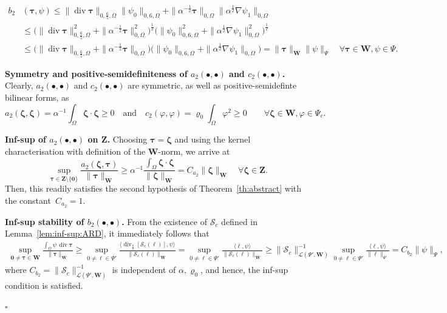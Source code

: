 \documentclass[11pt, reqno, a4paper, twoside]{article}
\newcommand\bzeta{\boldsymbol{\zeta}}
\newcommand\bzero{\boldsymbol{0}}
\newcommand\btau{\boldsymbol{\tau}}
\newcommand{\bW}{\mathbf{W}}
\newcommand{\bZ}{\mathbf{Z}}
\newcommand{\cL}{\mathcal{L}}
\newcommand{\cS}{\mathcal{S}}
\newcommand\vdiv{\mathop{\mathrm{div}}\nolimits}
\newenvironment{proof}{\noindent{\it Proof.}}{\hfill$\square$}
\numberwithin{equation}{section}
\numberwithin{remark}{section}
\numberwithin{figure}{section}
\numberwithin{table}{section}
\begin{document}
{\begin{proof}
    \begin{align*}
   b_2&(\btau,\psi) \leq \|\vdiv\btau\|_{0,\frac65,\Omega}\|\psi_0\|_{0,6,\Omega}+\|\alpha^{-\frac12}\btau\|_{0,\Omega}\|\alpha^{\frac12}\nabla\psi_1\|_{0,\Omega}\\
    &\leq\bigl(\|\vdiv\btau\|^2_{0,\frac65,\Omega}+\|\alpha^{-\frac12}\btau\|^2_{0,\Omega}\bigr)^{\frac12}\bigl(\|\psi_0\|^2_{0,6,\Omega}+\|\alpha^{\frac12}\nabla\psi_1\|^2_{0,\Omega}\bigr)^{\frac12} \\
    &\leq\bigl(\|\vdiv\btau\|_{0,\frac65,\Omega}+\|\alpha^{-\frac12}\btau\|_{0,\Omega}\bigr)\bigl(\|\psi_0\|_{0,6,\Omega}+\|\alpha^{\frac12}\nabla\psi_1\|_{0,\Omega}\bigr)=\|\btau\|_{\bW}\|\psi\|_{\Psi}\quad {\forall \btau \in \bW, \psi \in \Psi.}
\end{align*}

\smallskip
\noindent\textbf{Symmetry and positive-semidefiniteness of \(a_2(\bullet,\bullet)\) and \(c_2(\bullet,\bullet)\).} Clearly, \(a_2(\bullet,\bullet)\) and \(c_2(\bullet,\bullet)\) are symmetric, as well as positive-semidefinte bilinear forms, as  \[a_2(\bzeta,\bzeta)={\alpha^{-1}\int_\Omega \bzeta\cdot\bzeta} \geq0 \quad \text{and}\quad  c_2(\varphi,\varphi)= \varrho_0\int_{\Omega}\varphi^2\geq0 \qquad \forall \bzeta\in\bW, \varphi\in\Psi_c.\] 

\smallskip
\noindent\textbf{Inf-sup of \(a_2(\bullet,\bullet)\) on $\bZ$.} Choosing $\btau = \bzeta$ and using the kernel characterisation with definition of the $\bW$-norm, we arrive at  
\[ \sup_{\btau \in \bZ\setminus\{\boldsymbol{0}\}} \frac{a_2(\bzeta,\btau)}{\|\btau\|_{\bW}} {{\geq \alpha^{-1}\frac{\int_\Omega \bzeta\cdot\bzeta}{\|\bzeta\|_{\bW}}} =}  C_{a_2}\| \bzeta\|_{\bW} \quad \forall \bzeta \in \bZ.\]
Then, this readily 
satisfies the second hypothesis of Theorem~\ref{th:abstract} with the constant~\(C_{a_2}=1\).

\smallskip
\noindent\textbf{Inf-sup stability of \(b_2(\bullet,\bullet)\).} 
From the existence of $\cS_c$ defined in Lemma~\ref{lem:inf-sup:ARD}, it immediately follows that
\begin{align*}
\sup_{\bzero\neq\btau \in \bW} \!\!\frac{\int_\Omega \psi\,\vdiv \btau}{\|\btau\|_\bW} \geq \sup_{0\neq\ell \in \Psi'} \frac{{\langle{\vdiv}_{\frac65} [\cS_c(\ell)], \psi\rangle}}{\|\cS_c(\ell)\|_\bW} = \sup_{0\neq\ell \in \Psi'} \frac{\langle \ell, \psi \rangle}{\|\cS_c(\ell)\|_\bW} \geq \|\cS_c\|^{-1}_{\cL(\Psi', \bW)} \sup_{0\neq\ell \in \Psi'} \frac{\langle \ell, \psi \rangle}{\|\ell\|_{\Psi'}} = C_{b_2} \|\psi\|_{\Psi},
\end{align*}
where $C_{b_2} = \|\cS_c\|^{-1}_{\cL(\Psi', \bW)}$ is independent of \(\alpha,\varrho_0\), and hence, the inf-sup condition is satisfied.


\end{proof}}
\end{document}
